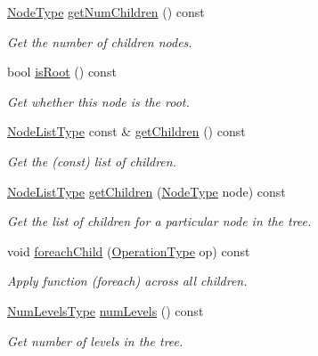 \begin{DoxyCompactItemize}
\hyperlink{namespacevt_a866da9d0efc19c0a1ce79e9e492f47e2}{Node\+Type} \hyperlink{structvt_1_1collective_1_1tree_1_1_tree_ad68dc6aac90193cc15955d7bd1a5b1fc}{get\+Num\+Children} () const
\begin{DoxyCompactList}\small\item\em Get the number of children nodes. \end{DoxyCompactList}\item 
bool \hyperlink{structvt_1_1collective_1_1tree_1_1_tree_a88b2add909b0035f4844317481ed559b}{is\+Root} () const
\begin{DoxyCompactList}\small\item\em Get whether this node is the root. \end{DoxyCompactList}\item 
\hyperlink{structvt_1_1collective_1_1tree_1_1_tree_a834e7b54ea2dceae42db7c5ea859753f}{Node\+List\+Type} const  \& \hyperlink{structvt_1_1collective_1_1tree_1_1_tree_a57b3edade6230de16232213b7c4380f5}{get\+Children} () const
\begin{DoxyCompactList}\small\item\em Get the (const) list of children. \end{DoxyCompactList}\item 
\hyperlink{structvt_1_1collective_1_1tree_1_1_tree_a834e7b54ea2dceae42db7c5ea859753f}{Node\+List\+Type} \hyperlink{structvt_1_1collective_1_1tree_1_1_tree_a39e27b1538bf00674a5a653dfd7a0e83}{get\+Children} (\hyperlink{namespacevt_a866da9d0efc19c0a1ce79e9e492f47e2}{Node\+Type} node) const
\begin{DoxyCompactList}\small\item\em Get the list of children for a particular node in the tree. \end{DoxyCompactList}\item 
void \hyperlink{structvt_1_1collective_1_1tree_1_1_tree_ad5546485f90dd449a203f174b1374a01}{foreach\+Child} (\hyperlink{structvt_1_1collective_1_1tree_1_1_tree_a5ce4242e9580c807baa74168401f381a}{Operation\+Type} op) const
\begin{DoxyCompactList}\small\item\em Apply function (foreach) across all children. \end{DoxyCompactList}\item 
\hyperlink{structvt_1_1collective_1_1tree_1_1_tree_af64acc9543dc1bd1b56d6ed17b003425}{Num\+Levels\+Type} \hyperlink{structvt_1_1collective_1_1tree_1_1_tree_a56532f6b47b9c71864980b73deee2d5a}{num\+Levels} () const
\begin{DoxyCompactList}\small\item\em Get number of levels in the tree. \end{DoxyCompactList}\item 

\end{DoxyCompactItemize}
